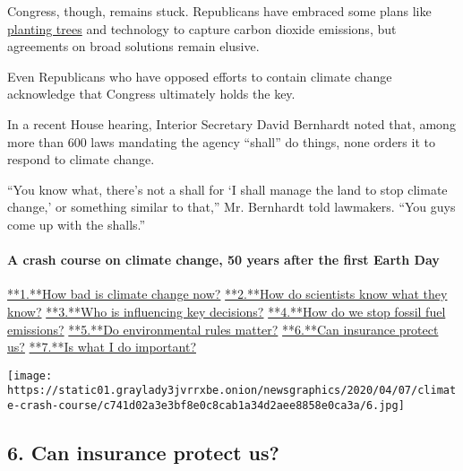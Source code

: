 Congress, though, remains stuck. Republicans have embraced some plans
like
\href{https://www.nytimes3xbfgragh.onion/2020/02/12/climate/trump-trees-climate-change.html}{planting
trees} and technology to capture carbon dioxide emissions, but
agreements on broad solutions remain elusive.

Even Republicans who have opposed efforts to contain climate change
acknowledge that Congress ultimately holds the key.

In a recent House hearing, Interior Secretary David Bernhardt noted
that, among more than 600 laws mandating the agency ``shall'' do things,
none orders it to respond to climate change.

``You know what, there's not a shall for `I shall manage the land to
stop climate change,' or something similar to that,'' Mr. Bernhardt told
lawmakers. ``You guys come up with the shalls.''

\hypertarget{a-crash-course-on-climate-change-50-years-after-the-first-earth-day-5}{%
\paragraph{A crash course on climate change, 50 years after the first
Earth
Day}\label{a-crash-course-on-climate-change-50-years-after-the-first-earth-day-5}}

\href{/interactive/2020/04/19/climate/climate-crash-course-1.html}{**1.**How
bad is climate change now?}
\href{/interactive/2020/04/19/climate/climate-crash-course-2.html}{**2.**How
do scientists know what they know?}
\href{/interactive/2020/04/19/climate/climate-crash-course-3.html}{**3.**Who
is influencing key decisions?}
\href{/interactive/2020/04/19/climate/climate-crash-course-4.html}{**4.**How
do we stop fossil fuel emissions?}
\href{/interactive/2020/04/19/climate/climate-crash-course-5.html}{**5.**Do
environmental rules matter?}
\href{/interactive/2020/04/19/climate/climate-crash-course-6.html}{**6.**Can
insurance protect us?}
\href{/interactive/2020/04/19/climate/climate-crash-course-7.html}{**7.**Is
what I do important?}

\texttt{[image: https://static01.graylady3jvrrxbe.onion/newsgraphics/2020/04/07/climate-crash-course/c741d02a3e3bf8e0c8cab1a34d2aee8858e0ca3a/6.jpg]}

\hypertarget{6-can-insurance-protect-us}{%
\subsection{\texorpdfstring{\textbf{6.} Can insurance protect
us?}{6. Can insurance protect us?}}\label{6-can-insurance-protect-us}}


